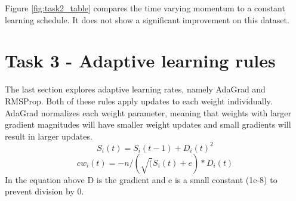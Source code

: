 \documentclass[12pt]{article}
\begin{document}
  Figure \ref{fig:task2_table} compares the time varying momentum to a constant learning schedule. It does not show a significant improvement on this dataset.




\section*{Task 3 - Adaptive learning rules }
The last section explores adaptive learning rates, namely AdaGrad and RMSProp. Both of these rules apply updates to each weight individually. AdaGrad normalizes each weight parameter, meaning that weights with larger gradient magnitudes will have smaller weight updates and small gradients will result in larger updates. 
\[ S_i(t) =S_i(t-1) + D_i(t)^2\] 
\[ cw_i(t) = -n/(\surd(S_i(t)+e)*D_i(t) \] 
In the equation above D is the gradient and e is a small constant (1e-8) to prevent division by 0. 
\end{document}
